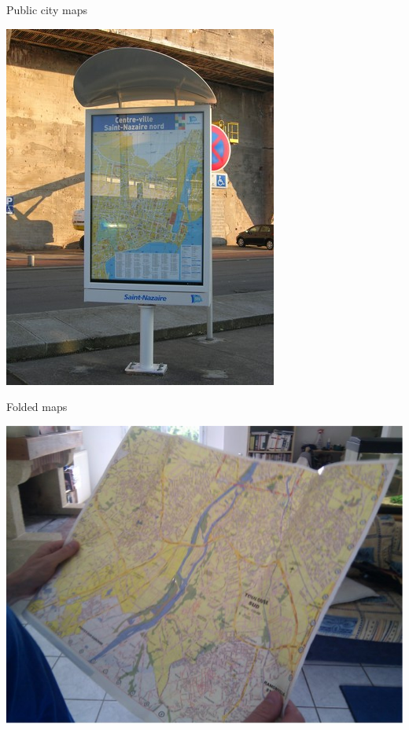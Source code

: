 \documentclass{beamer}
\begin{document}
\begin{frame}{Public city maps}
  \begin{center}
    \includegraphics[height=0.8\textheight]{public-city-map.jpg}
  \end{center}
\end{frame}

\begin{frame}{Folded maps}
  \begin{center}
    \includegraphics[height=0.8\textheight]{folded-map.jpg}
  \end{center}
\end{frame}
\end{document}
